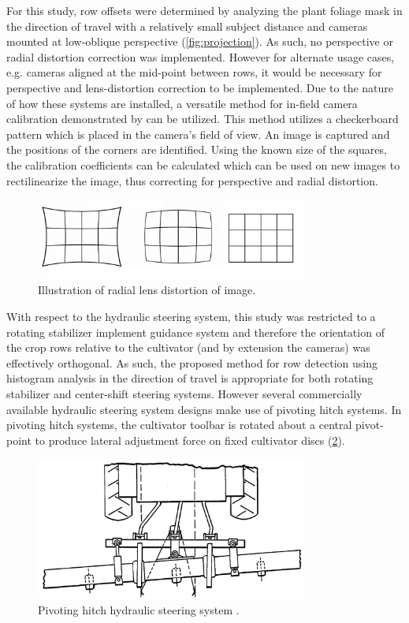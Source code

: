 \documentclass[authoryear]{elsarticle}
\begin{document}
For this study, row offsets were determined by analyzing the
plant foliage mask in the direction of travel with a relatively small
subject distance and cameras mounted at low-oblique perspective
(\ref{fig:projection}). As such, no perspective or radial distortion correction was
implemented. However for alternate usage cases, e.g. cameras aligned
at the mid-point between rows, it would be necessary for perspective
and lens-distortion correction to be implemented. Due to the nature of
how these systems are installed, a versatile method for in-field
camera calibration demonstrated by \citet{lee2009} can be
utilized. This method utilizes a checkerboard pattern which is placed
in the camera’s field of view. An image is captured and the positions
of the corners are identified. Using the known size of the squares,
the calibration coefficients can be calculated which can be used on
new images to rectilinearize the image, thus correcting for
perspective and radial distortion.

\begin{figure}[H]
  \centering
  \includegraphics[width=0.8\textwidth,natwidth=610,natheight=642]{lens_distortion.jpg}
  \caption{Illustration of radial lens distortion of image.}
  \label{fig:distortion}
\end{figure}

With respect to the hydraulic steering system, this study was restricted
to a rotating stabilizer implement guidance system
and therefore the orientation of the crop rows relative to the
cultivator (and by extension the cameras) was effectively
orthogonal. As such, the proposed method for row detection using histogram
analysis in the direction of travel is appropriate for both rotating
stabilizer and center-shift steering systems. However several
commercially available hydraulic steering system designs make use of
pivoting hitch systems. In pivoting hitch systems, the cultivator toolbar is
rotated about a central pivot-point to produce lateral adjustment
force on fixed cultivator discs (\ref{fig:pivoting_hitch}).

\begin{figure}[H]
  \centering
  \includegraphics[width=0.8\textwidth,natwidth=610,natheight=642]{pivoting_hitch.png}
  \caption{Pivoting hitch hydraulic steering system \citep{fleischer1990}.}
  \label{fig:pivoting_hitch}
\end{figure}
\end{document}
